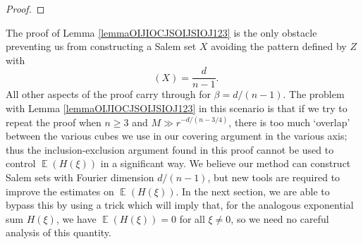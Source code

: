 \documentclass[dvipsnames,letterpaper,12pt]{article}
\numberwithin{equation}{section}
\DeclareMathOperator{\fordim}{\dim_{\mathbb{F}}}
\DeclareMathOperator{\ZZ}{\mathbb{Z}}
\DeclareMathOperator{\TT}{\mathbb{T}}
\numberwithin{theorem}{section}
\DeclareMathOperator{\EE}{\mathbb{E}}
\begin{document}
\begin{proof}
\end{proof}

The proof of Lemma \ref{lemmaOIJIOCJSOIJSIOJ123} is the only obstacle preventing us from constructing a Salem set $X$ avoiding the pattern defined by $Z$ with
%
\[ \fordim(X) = \frac{d}{n-1}. \]
%
All other aspects of the proof carry through for $\beta = d/(n-1)$. The problem with Lemma \ref{lemmaOIJIOCJSOIJSIOJ123} in this scenario is that if we try to repeat the proof when $n \geq 3$ and $M \gg r^{-d/(n-3/4)}$, there is too much `overlap' between the various cubes we use in our covering argument in the various axis; thus the inclusion-exclusion argument found in this proof cannot be used to control $\EE(H(\xi))$ in a significant way. We believe our method can construct Salem sets with Fourier dimension $d/(n-1)$, but new tools are required to improve the estimates on $\EE(H(\xi))$. In the next section, we are able to bypass this by using a trick which will imply that, for the analogous exponential sum $H(\xi)$, we have $\EE(H(\xi)) = 0$ for all $\xi \neq 0$, so we need no careful analysis of this quantity.
\end{document}
